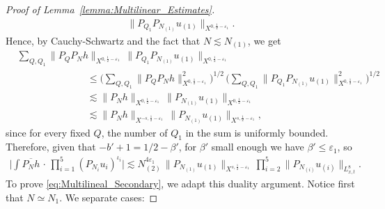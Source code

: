 \documentclass[11pt, xcolor = dvipsnames,reqno
]{amsart}
\theoremstyle{definition}
\theoremstyle{remark}
\begin{document}
\begin{proof}[Proof of Lemma~\ref{lemma:Multilinear_Estimates}]
\begin{align}
        \big\lVert  P_{Q_1} P_{N_{(1)}} u_{(1)} \big\rVert_{X^{0, \frac{1}{2} - \varepsilon_1}}. 
    \end{align}
Hence, by Cauchy-Schwartz and the fact that $N \lesssim N_{(1)}$, we get  
    \begin{align}\label{eq:Multilinear_Proof_Box_Localization}
        & \sum_{Q, Q_1} \lVert P_Q P_N  h \rVert_{X^{0, \frac{1}{2} - \varepsilon_1}} \, 
        \big\lVert  P_{Q_1} P_{N_{(1)}} u_{(1)} \big\rVert_{X^{0, \frac{1}{2} - \varepsilon_1}} \nonumber \\
        & \hspace{3cm}
        \leq 
        \Big( \sum_{Q, Q_1 } \lVert P_Q P_N  h \rVert_{X^{0, \frac{1}{2} - \varepsilon_1}}^2
        \Big)^{1/2}
        \, 
        \Big( \sum_{Q, Q_1} \lVert P_{Q_1} P_{N_{(1)}}  u_{(1)} \rVert_{X^{0, \frac{1}{2} - \varepsilon_1}}^2
        \Big)^{1/2} \nonumber \\
        & \hspace{3cm}
        \lesssim 
        \lVert P_N  h \rVert_{X^{0, \frac{1}{2} - \varepsilon_1}} \, 
        \lVert P_{N_{(1)}}  u_{(1)} \rVert_{X^{0, \frac{1}{2} - \varepsilon_1}} \nonumber \\
        & \hspace{3cm}
        \lesssim 
        \lVert P_N  h \rVert_{X^{-s, \frac{1}{2} - \varepsilon_1}} \, 
        \lVert P_{N_{(1)}}  u_{(1)} \rVert_{X^{s, \frac{1}{2} - \varepsilon_1}}, 
    \end{align}
    since for every fixed $Q$, the number of $Q_1$ in the sum is uniformly bounded. 
    Therefore, given that $-b' + 1 = 1/2 - \beta'$, for $\beta'$ small enough we have $\beta' \leq \varepsilon_1$, so
    \begin{align}
        \Big|\int \overline{P_N h} \, \cdot \, \prod_{i=1}^5 
        (P_{N_i} u_i)^{\iota_i} \Big|
        \lesssim
        N_{(2)}^{4\varepsilon_1} \,  
        \lVert P_{N_{(1)}}  u_{(1)} \rVert_{X^{s, \frac{1}{2} - \varepsilon_1}} \, 
        \prod_{i=2}^5 \big\lVert  P_{N_{(i)}} u_{(i)} \big\rVert_{L^8_{x,t}}.
    \end{align}
%
To prove \eqref{eq:Multilineal_Secondary}, we adapt this duality argument. Notice first that $N \simeq N_1$. 
We separate cases:
\hfill \break


\end{proof}
\end{document}

